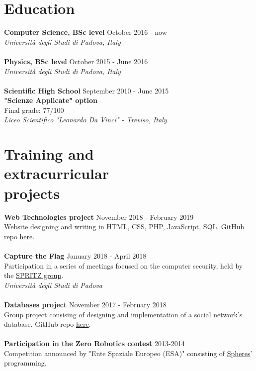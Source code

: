 \documentclass[margin, 10pt]{res}
\begin{document}
\begin{resume}
\section{Education}
\textbf{Computer Science, BSc level} \hfill October 2016 - now \\
\textit{Università degli Studi di Padova, Italy} \\ \\
\textbf{Physics, BSc level} \hfill October 2015 - June 2016 \\
\textit{Università degli Studi di Padova, Italy} \\ \\
\textbf{Scientific High School} \hfill September 2010 - June 2015 \\
\textbf{"Scienze Applicate" option} \\
Final grade: 77/100 \\
\textit{Liceo Scientifico "Leonardo Da Vinci" - Treviso, Italy} 


\section{Training and\\ extracurricular \\ projects}
\textbf{Web Technologies project} \hfill November 2018 - February 2019 \\
Website designing and writing in HTML, CSS, PHP, JavaScript, SQL. GitHub repo \href{https://github.com/enricobu96/TecWebUNIPD}{here}.\\ \\
\textbf{Capture the Flag} \hfill January 2018 - April 2018 \\
Participation in a series of meetings focused on the computer security, held by the \href{https://github.com/enricobu96/TecWebUNIPD}{SPRITZ group}. \\
\textit{Università degli Studi di Padova} \\ \\
\textbf{Databases project} \hfill November 2017 - February 2018 \\
Group project consising of designing and implementation of a social network's database. GitHub repo \href{https://github.com/enricobu96/DB1718}{here}. \\ \\
\textbf{Participation in the Zero Robotics contest} \hfill 2013-2014 \\
Competition announced by "Ente Spaziale Europeo (ESA)" consisting of \href{https://www.esa.int/Science_Exploration/Human_and_Robotic_Exploration/Education/Robot_Spheres_in_zero-gravity_action}{Spheres}' programming.


\end{resume}
\end{document}
